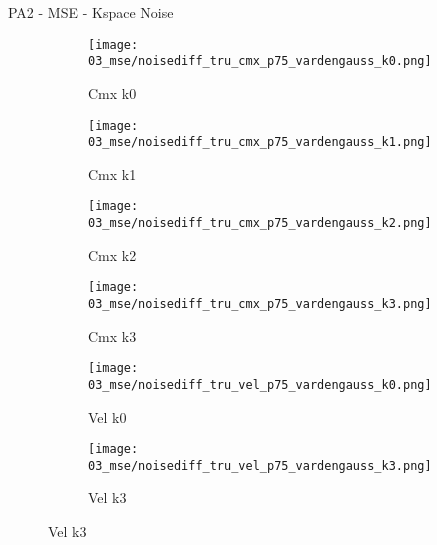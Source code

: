 \documentclass{beamer}
\begin{document}
\begin{frame}{PA2 - MSE - Kspace Noise}{}
\begin{figure}
\begin{subfigure}{0.24\textwidth}
\texttt{[image: 03\_mse/noisediff\_tru\_cmx\_p75\_vardengauss\_k0.png]}
\vspace{-20pt}
\caption*{\tiny Cmx k0}
\end{subfigure}
\begin{subfigure}{0.24\textwidth}
\texttt{[image: 03\_mse/noisediff\_tru\_cmx\_p75\_vardengauss\_k1.png]}
\vspace{-20pt}
\caption*{\tiny Cmx k1}
\end{subfigure}
\begin{subfigure}{0.24\textwidth}
\texttt{[image: 03\_mse/noisediff\_tru\_cmx\_p75\_vardengauss\_k2.png]}
\vspace{-20pt}
\caption*{\tiny Cmx k2}
\end{subfigure}
\begin{subfigure}{0.24\textwidth}
\texttt{[image: 03\_mse/noisediff\_tru\_cmx\_p75\_vardengauss\_k3.png]}
\vspace{-20pt}
\caption*{\tiny Cmx k3}
\end{subfigure}

\begin{subfigure}{0.49\textwidth}
\texttt{[image: 03\_mse/noisediff\_tru\_vel\_p75\_vardengauss\_k0.png]}
\vspace{-20pt}
\caption*{\tiny Vel k0}
\end{subfigure}
\begin{subfigure}{0.49\textwidth}
\texttt{[image: 03\_mse/noisediff\_tru\_vel\_p75\_vardengauss\_k3.png]}
\vspace{-20pt}
\caption*{\tiny Vel k3}
\end{subfigure}
\end{figure}
\end{frame}
\end{document}
